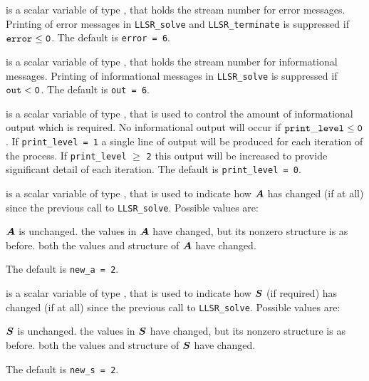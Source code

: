 \documentclass{galahad}
\newcommand{\packagename}{LLSR}
\begin{document}
\begin{description}
 is a scalar variable of type \integer, that holds the
stream number for error messages.
Printing of error messages in
{\tt \packagename\_solve} and {\tt \packagename\_terminate}
is suppressed if ${\tt error} \leq {\tt 0}$.
The default is {\tt error = 6}.

 is a scalar variable of type \integer, that holds the
stream number for informational messages.
Printing of informational messages in
{\tt \packagename\_solve} is suppressed if ${\tt out} < {\tt 0}$.
The default is {\tt out = 6}.

 is a scalar variable of type \integer,
that is used
to control the amount of informational output which is required. No
informational output will occur if ${\tt print\_level} \leq {\tt 0}$. If
{\tt print\_level = 1} a single line of output will be produced for each
iteration of the process. If {\tt print\_level} $\geq$ {\tt 2} this output
will be increased to provide significant detail of each iteration.
The default is {\tt print\_level = 0}.


 is a scalar variable of type \integer, that is used
to indicate how ${\bm{A}}$ has changed (if at all) since the previous
call to {\tt \packagename\_solve}. Possible values are:
\begin{description}
 ${\bm{A}}$ is unchanged.
 the values in ${\bm{A}}$ have changed, but its nonzero structure
is as before.
 both the values and structure of ${\bm{A}}$ have changed.
\end{description}
The default is {\tt new\_a = 2}.

 is a scalar variable of type \integer, that is used
to indicate how ${\bm{S}}$ (if required) has changed (if at all) since the previous
call to {\tt \packagename\_solve}. Possible values are:
\begin{description}
 ${\bm{S}}$ is unchanged.
 the values in ${\bm{S}}$ have changed, but its nonzero structure
is as before.
 both the values and structure of ${\bm{S}}$ have changed.
\end{description}
The default is {\tt new\_s = 2}.


\end{description}
\end{document}
